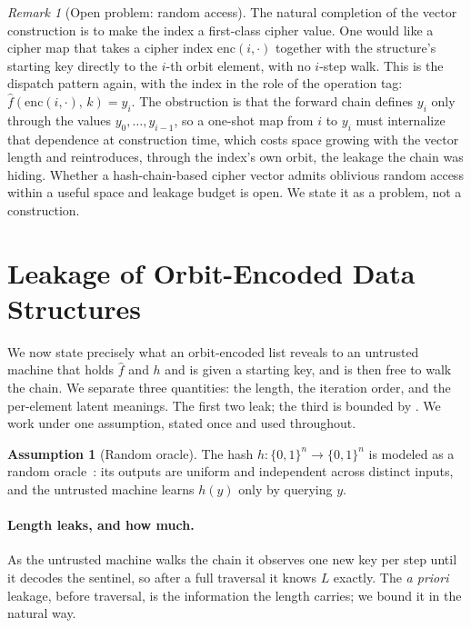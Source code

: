 \documentclass[11pt]{article}
\theoremstyle{definition}
\theoremstyle{plain}
\theoremstyle{definition}
\newtheorem{assumption}{Assumption}[section]
\theoremstyle{remark}
\newtheorem{remark}{Remark}[section]
\newcommand{\enc}{\mathrm{enc}}
\newcommand{\fhat}{\hat{f}}
\newcommand{\B}{\{0,1\}}
\begin{document}
\begin{remark}[Open problem: random access]
\label{rem:random-access}
The natural completion of the vector construction is to make the index
a first-class cipher value. One would like a cipher map that takes a
cipher index $\enc(i, \cdot)$ together with the structure's starting
key directly to the $i$-th orbit element, with no $i$-step walk. This
is the dispatch pattern again, with the index in the role of the
operation tag: $\fhat(\enc(i,\cdot),\, k) = y_i$. The obstruction is
that the forward chain defines $y_i$ only through the values $y_0,
\ldots, y_{i-1}$, so a one-shot map from $i$ to $y_i$ must internalize
that dependence at construction time, which costs space growing with
the vector length and reintroduces, through the index's own orbit, the
leakage the chain was hiding. Whether a hash-chain-based cipher vector
admits oblivious random access within a useful space and leakage budget
is open. We state it as a problem, not a construction.
\end{remark}

\section{Leakage of Orbit-Encoded Data Structures}
\label{sec:leakage}

We now state precisely what an orbit-encoded list reveals to an
untrusted machine that holds $\fhat$ and $h$ and is given a starting
key, and is then free to walk the chain. We separate three quantities:
the length, the iteration order, and the per-element latent meanings.
The first two leak; the third is bounded by . We
work under one assumption, stated once and used throughout.

\begin{assumption}[Random oracle]
\label{ass:ro}
The hash $h : \B^n \to \B^n$ is modeled as a random
oracle~\cite{bellare1993random}: its outputs are uniform and
independent across distinct inputs, and the untrusted machine learns
$h(y)$ only by querying $y$.
\end{assumption}

\paragraph{Length leaks, and how much.} As the untrusted machine walks
the chain it observes one new key per step until it decodes the
sentinel, so after a full traversal it knows $L$ exactly. The
\emph{a priori} leakage, before traversal, is the information the
length carries; we bound it in the natural way.
\end{document}
